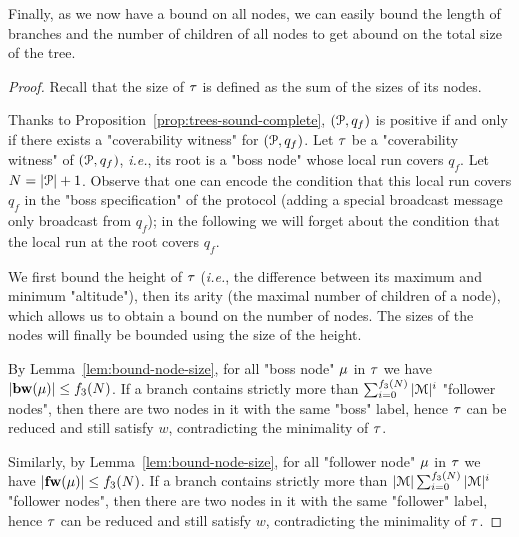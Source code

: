 Finally, as we now have a bound on all nodes, we can easily bound the length of branches and the number of children of all nodes to get abound on the total size of the tree.

\PropBoundTreeSize*


\begin{proof}
	Recall that the size of $\tau$ is defined as the sum of the sizes of its nodes. 

	Thanks to Proposition~\ref{prop:trees-sound-complete}, $(\mathcal{P},q_f)$ is positive if and only if there exists a "coverability witness" for $(\mathcal{P},q_f)$.
	Let $\tau$ be a "coverability witness" of $(\mathcal{P},q_f)$, \emph{i.e.}, its root is a "boss node" whose local run covers $q_f$. Let $N = |\mathcal{P}|+1$. Observe that one can encode the condition that this local run covers $q_f$ in the "boss specification" of the protocol (adding a special broadcast message only broadcast from $q_f$); in the following we will forget about the condition that the local run at the root covers $q_f$.
	
	We first bound the height of $\tau$ (\emph{i.e.}, the difference between its maximum and minimum "altitude"), then its arity (the maximal number of children of a node), which allows us to obtain a bound on the number of nodes. The sizes of the nodes will finally be bounded using the size of the height. 
	
	By Lemma~\ref{lem:bound-node-size}, for all "boss node" $\mu$ in $\tau$ we have $|\mathbf{bw}(\mu)| \leq f_3(N)$.
	If a branch contains strictly more than $\sum_{i=0}^{f_3(N)}|\mathcal{M}|^{i}$ "follower nodes", then there are two nodes in it with the same "boss" label, hence $\tau$ can be reduced and still satisfy $w$, contradicting the minimality of $\tau$.

	Similarly, by Lemma~\ref{lem:bound-node-size}, for all "follower node" $\mu$ in $\tau$ we have $|\mathbf{fw}(\mu)| \leq f_3(N)$.
	If a branch contains strictly more than $|\mathcal{M}| \sum_{i=0}^{f_3(N)}|\mathcal{M}|^{i}$ "follower nodes", then there are two nodes in it with the same "follower" label, hence $\tau$ can be reduced and still satisfy $w$, contradicting the minimality of $\tau$.
	

\end{proof}
